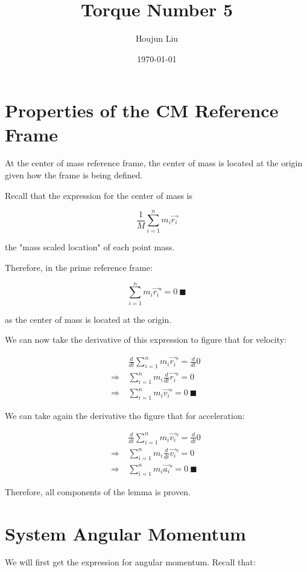 \documentclass[letterpaper]{article}
\author{Houjun Liu}
\date{\today}
\title{Torque Number 5}
\renewcommand{\tableofcontents}{}
\renewcommand\maketitle{}
\begin{document}
\maketitle
\tableofcontents


\section{Properties of the CM Reference Frame}
\label{sec:orga2c322f}
At the center of mass reference frame, the center of mass is located at the origin given how the frame is being defined.

Recall that the expression for the center of mass is

\begin{equation}
   \frac{1}{M} \sum_{i=1}^n m_i \vec{r_i}
\end{equation}

the "mass scaled location" of each point mass. 

Therefore, in the prime reference frame:

\begin{equation}
   \sum_{i=1}^n m_i\vec{r_i}' = 0\ \blacksquare
\end{equation}

as the center of mass is located at the origin.

We can now take the derivative of this expression to figure that for velocity:

\begin{align}
   &\frac{d}{dt} \sum_{i=1}^n m_i\vec{r_i}' = \frac{d}{dt} 0\ \\
   \Rightarrow\ &\sum_{i=1}^n m_i\frac{d}{dt} \vec{r_i}' = 0\ \\
   \Rightarrow\ &\sum_{i=1}^n m_i\vec{v_i}' = 0\ \blacksquare
\end{align}

We can take again the derivative tho figure that for acceleration:

\begin{align}
   &\frac{d}{dt} \sum_{i=1}^n m_i\vec{v_i}' = \frac{d}{dt} 0\ \\
   \Rightarrow\ &\sum_{i=1}^n m_i\frac{d}{dt} \vec{v_i}' = 0\ \\
   \Rightarrow\ &\sum_{i=1}^n m_i\vec{a_i}' = 0\ \blacksquare
\end{align}

Therefore, all components of the lemma is proven.

\section{System Angular Momentum}
\label{sec:orge17d894}
We will first get the expression for angular momentum. Recall that:
\end{document}

